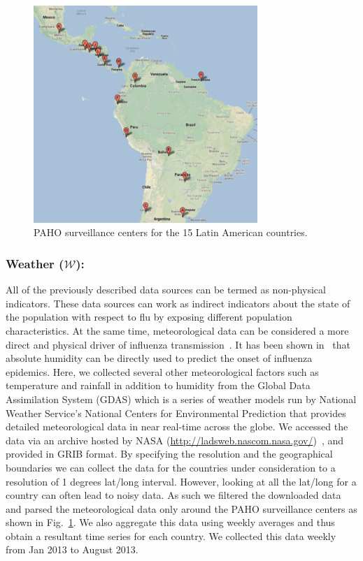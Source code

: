 \begin{figure} 
  \includegraphics[width=3.33in]{fig/humidity_centers.pdf}
  \caption{\label{fig:surveillance} PAHO surveillance centers for the 15 Latin
  American countries.}
\end{figure}

\subsubsection{Weather ($\mathcal{W}$):}
All of the previously described data sources can
be termed as non-physical indicators. These data sources can work as indirect
indicators about the state of the population with respect to flu by exposing
different population characteristics. At the same time, meteorological data can
be considered a more direct and physical driver of influenza transmission~\cite{flu_humidity_physical}. It 
has been shown in~\cite{Shaman_orig_humidity_link, Shaman_humidity_USA, ref9}
that absolute humidity can be directly used to predict the onset of influenza
epidemics. Here, we collected several other meteorological factors such as
temperature and rainfall in addition to humidity from the Global Data
Assimilation System (GDAS) which is a series of weather models run by National
Weather Service's National Centers for Environmental Prediction that provides
detailed meteorological data in near real-time across the globe.  We accessed
the data via an archive hosted by NASA (\url{http://ladsweb.nascom.nasa.gov/})~\cite{HD:2013}, 
and provided in GRIB format. By specifying the resolution and
the geographical boundaries we can collect the data for the countries under
consideration to a resolution of 1 degrees lat/long interval. However, looking
at all the lat/long for a country can often lead to noisy data. As such we
filtered the downloaded data and parsed the meteorological data only around the
PAHO surveillance centers as shown in Fig.~\ref{fig:surveillance}. We also
aggregate this data using weekly averages and thus obtain a resultant time series
for each country. We collected this data weekly from Jan 2013 to August 2013. 


